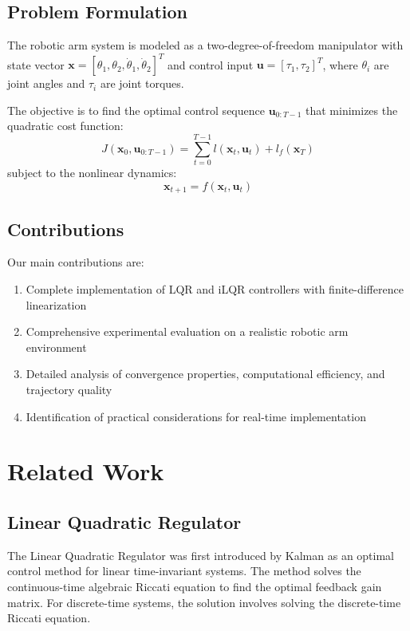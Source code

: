 \documentclass[conference]{IEEEtran}
\begin{document}
\subsection{Problem Formulation}

The robotic arm system is modeled as a two-degree-of-freedom manipulator with state vector $\mathbf{x} = [\theta_1, \theta_2, \dot{\theta}_1, \dot{\theta}_2]^T$ and control input $\mathbf{u} = [\tau_1, \tau_2]^T$, where $\theta_i$ are joint angles and $\tau_i$ are joint torques.

The objective is to find the optimal control sequence $\mathbf{u}_{0:T-1}$ that minimizes the quadratic cost function:
\begin{equation}
J(\mathbf{x}_0, \mathbf{u}_{0:T-1}) = \sum_{t=0}^{T-1} l(\mathbf{x}_t, \mathbf{u}_t) + l_f(\mathbf{x}_T)
\end{equation}
subject to the nonlinear dynamics:
\begin{equation}
\mathbf{x}_{t+1} = f(\mathbf{x}_t, \mathbf{u}_t)
\end{equation}

\subsection{Contributions}

Our main contributions are:
\begin{enumerate}
\item Complete implementation of LQR and iLQR controllers with finite-difference linearization
\item Comprehensive experimental evaluation on a realistic robotic arm environment
\item Detailed analysis of convergence properties, computational efficiency, and trajectory quality
\item Identification of practical considerations for real-time implementation
\end{enumerate}

\section{Related Work}

\subsection{Linear Quadratic Regulator}

The Linear Quadratic Regulator was first introduced by Kalman \cite{kalman1960contributions} as an optimal control method for linear time-invariant systems. The method solves the continuous-time algebraic Riccati equation to find the optimal feedback gain matrix. For discrete-time systems, the solution involves solving the discrete-time Riccati equation.
\end{document}
